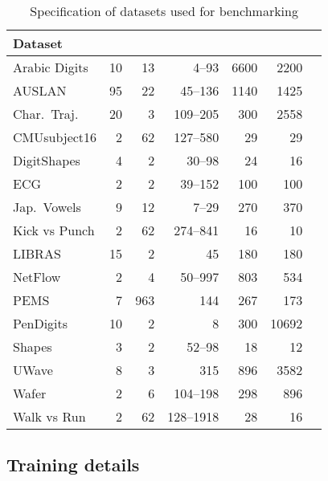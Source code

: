 \documentclass{article}
\begin{document}
\begin{table}[t]
	\caption{Specification of datasets used for benchmarking}
	\label{table:dataset_spec}
\begin{center}
    \begin{small}
    \begin{sc}
    \begin{tabular}{lrrrrrr}
    \toprule
    Dataset  &  &  &  &  &  \\
    \midrule
        Arabic Digits & 10 & 13 & \numrange[range-phrase = --]{4}{93} & 6600 & 2200\\
        AUSLAN & 95 & 22 & \numrange[range-phrase = --]{45}{136} & 1140 & 1425\\
        Char.~Traj.& 20 & 3 & \numrange[range-phrase = --]{109}{205} & 300 & 2558\\
        CMUsubject16 & 2 & 62 & \numrange[range-phrase = --]{127}{580} & 29 & 29\\
        DigitShapes & 4 & 2 & \numrange[range-phrase = --]{30}{98} & 24 & 16\\
        ECG & 2 & 2 & \numrange[range-phrase = --]{39}{152} & 100 & 100\\
        Jap.~Vowels & 9 & 12 & \numrange[range-phrase = --]{7}{29} & 270 & 370\\
        Kick vs Punch & 2 & 62 & \numrange[range-phrase = --]{274}{841} & 16 & 10\\
        LIBRAS & 15 & 2 & 45 & 180 & 180\\
        NetFlow & 2 & 4 & \numrange[range-phrase = --]{50}{997} & 803 & 534\\
        PEMS & 7 & 963 & 144 & 267 & 173\\
        PenDigits & 10 & 2 & 8 & 300 & 10692\\
        Shapes & 3 & 2 & \numrange[range-phrase = --]{52}{98} & 18 & 12\\
        UWave & 8 & 3 & 315 & 896 & 3582\\
        Wafer & 2 & 6 & \numrange[range-phrase = --]{104}{198} & 298 & 896\\
        Walk vs Run & 2 & 62 & \numrange[range-phrase = --]{128}{1918} & 28 & 16\\
    \bottomrule
    \end{tabular}
    \end{sc}
    \end{small}
    \end{center}
\end{table}

\subsection{Training details} \label{app:training}
\end{document}
